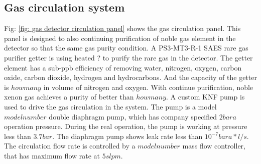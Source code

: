\subsection{Gas circulation system}
Fig: \ref{fig: gas detector circulation panel} shows the gas circulation panel. This panel is designed to also continuing purification of noble gas element in the detector so that the same gas purity condition. A PS3-MT3-R-1 SAES rare gas purifier getter is using heated ? to purify the rare gas in the detector. The getter element has a sub-ppb efficiency of removing water, nitrogen, oxygen, carbon oxide, carbon dioxide, hydrogen and hydrocarbons. And the capacity of the getter is $how many$ in volume of nitrogen and oxygen. With continue purification, noble xenon gas achieves a purity of better than $how many$. A custom KNF pump is used to drive the gas circulation in the system. The pump is a model $model number$ double diaphragm pump, which has company specified $2 bara$ operation pressure. During the real operation, the pump is working at pressure less than $3.7 bar$. The diaphragm pump shows leak rate less than $10^{-7} bara*l/s$. The circulation flow rate is controlled by a $model number$ mass flow controller, that has maximum flow rate at $5slpm$.    
